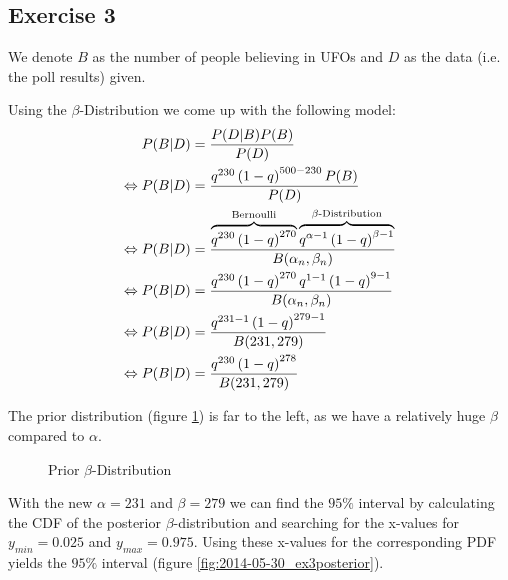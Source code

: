\subsection*{Exercise 3}
We denote $B$ as the number of people believing in UFOs and $D$ as the data (i.e. the poll results) given.

Using the $\beta$-Distribution we come up with the following model:
\begin{align*}\index{Bernoulli Distribution}
                P(B|D) &= \frac{P(D|B)P(B)}{P(D)} \\
\Leftrightarrow P(B|D) &= \frac{q^{230}\left(1-q\right)^{500-230}P(B)}{P(D)}\\
\Leftrightarrow P(B|D) &= \frac{\overbrace{q^{230}\left(1-q\right)^{270}}^\text{Bernoulli} \overbrace{q^{\alpha-1}\left(1-q\right)^{\beta-1}}^\text{$\beta$-Distribution}}{B(\alpha_n,\beta_n)} \\
\Leftrightarrow P(B|D) &= \frac{q^{230}\left(1-q\right)^{270} q^{1-1}\left(1-q\right)^{9-1}}{B(\alpha_n,\beta_n)} \\
\Leftrightarrow P(B|D) &= \frac{q^{231-1}\left(1-q\right)^{279-1}}{B(231,279)} \\
\Leftrightarrow P(B|D) &= \frac{q^{230}\left(1-q\right)^{278}}{B(231,279)}
\end{align*}

The prior distribution (figure \ref{fig:2014-05-30_ex3prior}) is far to the left, as we have a relatively huge $\beta$ compared to $\alpha$.

\begin{figure}[!ht]
\centering
{}
\caption{Prior $\beta$-Distribution}
\label{fig:2014-05-30_ex3prior}
\end{figure}

With the new $\alpha = 231$ and $\beta = 279$ we can find the $95\%$ interval by calculating the CDF of the posterior $\beta$-distribution and searching for the x-values for $y_{min}=0.025$ and $y_{max}=0.975$. Using these x-values for the corresponding PDF yields the $95\%$ interval (figure \ref{fig:2014-05-30_ex3posterior}).

